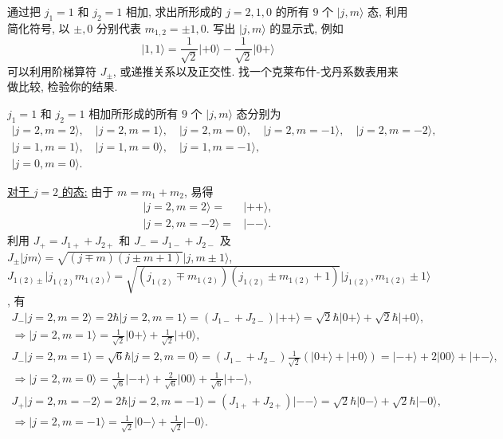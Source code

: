\documentclass{assignment}
\begin{document}
\begin{prob}[课本习题 3.24]
    通过把 $j_1=1$ 和 $j_2=1$ 相加, 求出所形成的 $j=2,1,0$ 的所有 $9$ 个 $\lvert j,m\rangle$ 态, 利用简化符号, 以 $\pm,0$ 分别代表 $m_{1,2}=\pm 1,0$. 写出 $\lvert j,m\rangle$ 的显示式, 例如
    \[
        \lvert 1,1\rangle=\frac{1}{\sqrt{2}}\lvert+0\rangle-\frac{1}{\sqrt{2}}\lvert 0+\rangle
    \]
    可以利用阶梯算符 $J_{\pm}$, 或递推关系以及正交性. 找一个克莱布什-戈丹系数表用来做比较, 检验你的结果.
\end{prob}
\begin{sol}
    $j_1=1$ 和 $j_2=1$ 相加所形成的所有 $9$ 个 $\lvert j,m\rangle$ 态分别为
    \begin{gather*}
        \lvert j=2,m=2\rangle,\quad\lvert j=2,m=1\rangle,\quad\lvert j=2,m=0\rangle,\quad\lvert j=2,m=-1\rangle,\quad\lvert j=2,m=-2\rangle,\\
        \lvert j=1,m=1\rangle,\quad\lvert j=1,m=0\rangle,\quad\lvert j=1,m=-1\rangle,\\
        \lvert j=0,m=0\rangle.
    \end{gather*}

    \uline{对于 $j=2$ 的态:} 由于 $m=m_1+m_2$, 易得
    \begin{align}
        \lvert j=2,m=2\rangle=&\lvert++\rangle,\\
        \lvert j=2,m=-2\rangle=&\lvert--\rangle.
    \end{align}
    利用 $J_+=J_{1+}+J_{2+}$ 和 $J_-=J_{1-}+J_{2-}$ 及 $J_{\pm}\lvert jm\rangle=\sqrt{(j\mp m)(j\pm m+1)}\lvert j,m\pm 1\rangle$, $J_{1(2)\pm}\lvert j_{1(2)}m_{1(2)}\rangle=\sqrt{(j_{1(2)}\mp m_{1(2)})(j_{1(2)}\pm m_{1(2)}+1)}\lvert j_{1(2)},m_{1(2)}\pm 1\rangle$, 有
    \begin{gather}
        J_-\lvert j=2,m=2\rangle=2\hbar\lvert j=2,m=1\rangle=(J_{1-}+J_{2-})\lvert++\rangle=\sqrt{2}\hbar\lvert 0+\rangle+\sqrt{2}\hbar\lvert +0\rangle,\\
        \Longrightarrow\lvert j=2,m=1\rangle=\frac{1}{\sqrt{2}}\lvert 0+\rangle+\frac{1}{\sqrt{2}}\lvert+0\rangle,\\
        J_-\lvert j=2,m=1\rangle=\sqrt{6}\hbar\lvert j=2,m=0\rangle=(J_{1-}+J_{2-})\frac{1}{\sqrt{2}}(\lvert 0+\rangle+\lvert+0\rangle)=\lvert-+\rangle+2\lvert 00\rangle+\lvert+-\rangle,\\
        \Longrightarrow\lvert j=2,m=0\rangle=\frac{1}{\sqrt{6}}\lvert-+\rangle+\frac{2}{\sqrt{6}}\lvert 00\rangle+\frac{1}{\sqrt{6}}\lvert+-\rangle,\\
        J_+\lvert j=2,m=-2\rangle=2\hbar\lvert j=2,m=-1\rangle=(J_{1+}+J_{2+})\lvert--\rangle=\sqrt{2}\hbar\lvert 0-\rangle+\sqrt{2}\hbar\lvert-0\rangle,\\
        \Longrightarrow\lvert j=2,m=-1\rangle=\frac{1}{\sqrt{2}}\lvert 0-\rangle+\frac{1}{\sqrt{2}}\lvert-0\rangle.
    \end{gather}


\end{sol}
\end{document}
